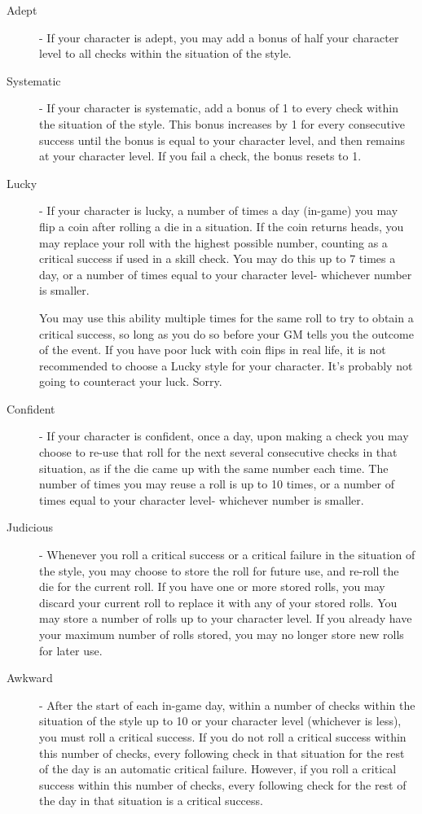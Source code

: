 \begin{description}
\item[Adept] - If your character is adept, you may add a bonus of half your character level to all checks within the situation of the style.

\item[Systematic] - If your character is systematic, add a bonus of 1 to every check within the situation of the style. This bonus increases by 1 for every consecutive success until the bonus is equal to your character level, and then remains at your character level. If you fail a check, the bonus resets to 1.

\item[Lucky] - If your character is lucky, a number of times a day (in-game) you may flip a coin after rolling a die in a situation. If the coin returns heads, you may replace your roll with the highest possible number, counting as a critical success if used in a skill check. You may do this up to 7 times a day, or a number of times equal to your character level- whichever number is smaller.

You may use this ability multiple times for the same roll to try to obtain a critical success, so long as you do so before your GM tells you the outcome of the event. If you have poor luck with coin flips in real life, it is not recommended to choose a Lucky style for your character. It's probably not going to counteract your luck. Sorry.

\item[Confident] - If your character is confident, once a day, upon making a check you may choose to re-use that roll for the next several consecutive checks in that situation, as if the die came up with the same number each time. The number of times you may reuse a roll is up to 10 times, or a number of times equal to your character level- whichever number is smaller.

\item[Judicious] - Whenever you roll a critical success or a critical failure in the situation of the style, you may choose to store the roll for future use, and re-roll the die for the current roll. If you have one or more stored rolls, you may discard your current roll to replace it with any of your stored rolls. You may store a number of rolls up to your character level. If you already have your maximum number of rolls stored, you may no longer store new rolls for later use.

\item[Awkward] - After the start of each in-game day, within a number of checks within the situation of the style up to 10 or your character level (whichever is less), you must roll a critical success. If you do not roll a critical success within this number of checks, every following check in that situation for the rest of the day is an automatic critical failure. However, if you roll a critical success within this number of checks, every following check for the rest of the day in that situation is a critical success.


\end{description}
